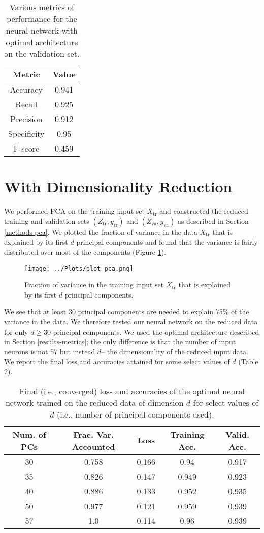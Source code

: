 \documentclass[12pt]{article}
\newcommand{\Xtr}{X_{\mbox{tr}}}
\newcommand{\ytr}{y_{\mbox{tr}}}
\newcommand{\yva}{y_{\mbox{va}}}
\newcommand{\Ztr}{Z_{\mbox{tr}}}
\newcommand{\Zva}{Z_{\mbox{va}}}
\begin{document}
\begin{table}
\centering
\begin{tabular}{|c|c|} \hline
Metric & Value \\ \hline
Accuracy & 0.941 \\
Recall & 0.925 \\
Precision & 0.912 \\
Specificity & 0.95 \\
F-score & 0.459 \\
\hline
\end{tabular}
\caption{\label{table3} Various metrics of performance for the neural network with optimal architecture on the validation set.}
\end{table}


\section{With Dimensionality Reduction}
\label{results-pca}

We performed PCA on the training input set $\Xtr$ and constructed the reduced training and validation sets $(\Ztr, \ytr)$ and $(\Zva, \yva)$ as described in Section \ref{methods-pca}. We plotted the fraction of variance in the data $\Xtr$ that is explained by its first $d$ principal components and found that the variance is fairly distributed over most of the components (Figure \ref{plot-pca}).

\begin{figure}
\centering
\texttt{[image: ../Plots/plot-pca.png]}
\caption{\label{plot-pca} Fraction of variance in the training input set $\Xtr$ that is explained by its first $d$ principal components.}
\end{figure}

We see that at least 30 principal components are needed to explain 75\% of the variance in the data. We therefore tested our neural network on the reduced data for only $d\geq 30$ principal components. We used the optimal architecture described in Section \ref{results-metrics}; the only difference is that the number of input neurons is not 57 but instead $d$-- the dimensionality of the reduced input data. We report the final loss and accuracies attained for some select values of $d$ (Table \ref{table4}).

\begin{table}
\centering
\begin{tabular}{|c|c|c|c|c|} \hline
Num. of PCs & Frac. Var. Accounted & Loss & Training Acc. & Valid. Acc. \\ \hline
30 & 0.758 & 0.166 & 0.94 & 0.917 \\
35 & 0.826 & 0.147 & 0.949 & 0.923 \\
40 & 0.886 & 0.133 & 0.952 & 0.935 \\
50 & 0.977 & 0.121 & 0.959 & 0.939 \\
57 & 1.0 & 0.114 & 0.96 & 0.939 \\
\hline
\end{tabular}
\caption{\label{table4} Final (i.e., converged) loss and accuracies of the optimal neural network trained on the reduced data of dimension $d$ for select values of $d$ (i.e., number of principal components used).}
\end{table}
\end{document}
